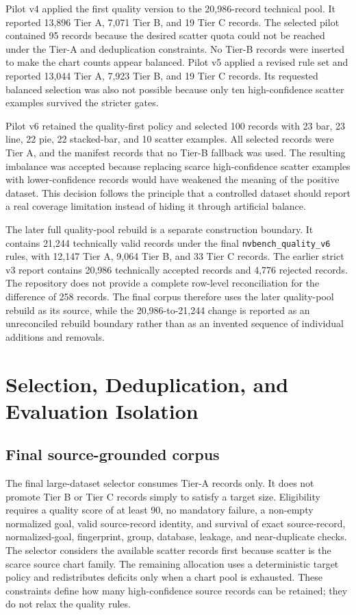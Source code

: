 Pilot v4 applied the first quality version to the 20,986-record technical pool. It reported 13,896 Tier A, 7,071 Tier B, and 19 Tier C records. The selected pilot contained 95 records because the desired scatter quota could not be reached under the Tier-A and deduplication constraints. No Tier-B records were inserted to make the chart counts appear balanced. Pilot v5 applied a revised rule set and reported 13,044 Tier A, 7,923 Tier B, and 19 Tier C records. Its requested balanced selection was also not possible because only ten high-confidence scatter examples survived the stricter gates.

Pilot v6 retained the quality-first policy and selected 100 records with 23 bar, 23 line, 22 pie, 22 stacked-bar, and 10 scatter examples. All selected records were Tier A, and the manifest records that no Tier-B fallback was used. The resulting imbalance was accepted because replacing scarce high-confidence scatter examples with lower-confidence records would have weakened the meaning of the positive dataset. This decision follows the principle that a controlled dataset should report a real coverage limitation instead of hiding it through artificial balance.

The later full quality-pool rebuild is a separate construction boundary. It contains 21,244 technically valid records under the final \texttt{nvbench\_quality\_v6} rules, with 12,147 Tier A, 9,064 Tier B, and 33 Tier C records. The earlier strict v3 report contains 20,986 technically accepted records and 4,776 rejected records. The repository does not provide a complete row-level reconciliation for the difference of 258 records. The final corpus therefore uses the later quality-pool rebuild as its source, while the 20,986-to-21,244 change is reported as an unreconciled rebuild boundary rather than as an invented sequence of individual additions and removals.

\section{Selection, Deduplication, and Evaluation Isolation}

\subsection{Final source-grounded corpus}

The final large-dataset selector consumes Tier-A records only. It does not promote Tier B or Tier C records simply to satisfy a target size. Eligibility requires a quality score of at least 90, no mandatory failure, a non-empty normalized goal, valid source-record identity, and survival of exact source-record, normalized-goal, fingerprint, group, database, leakage, and near-duplicate checks. The selector considers the available scatter records first because scatter is the scarce source chart family. The remaining allocation uses a deterministic target policy and redistributes deficits only when a chart pool is exhausted. These constraints define how many high-confidence source records can be retained; they do not relax the quality rules.

